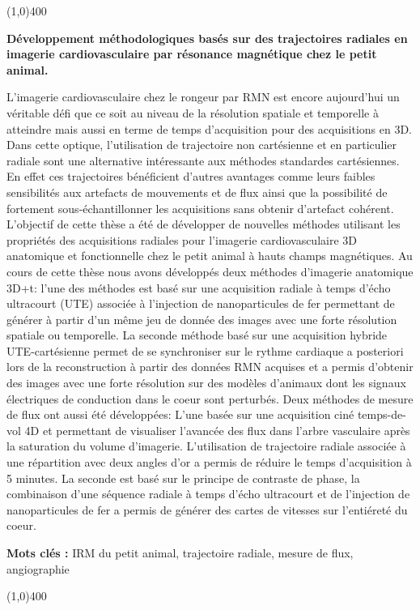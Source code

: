 \line(1,0){400} \\

\noindent
\small{\textbf{Développement méthodologiques basés sur des trajectoires radiales en imagerie cardiovasculaire par résonance magnétique chez le petit animal.}


L'imagerie cardiovasculaire chez le rongeur par RMN est encore aujourd'hui un véritable défi que ce soit au niveau de la résolution spatiale et temporelle à atteindre mais aussi en terme de temps d'acquisition pour des acquisitions en 3D.
Dans cette optique, l'utilisation de trajectoire non cartésienne et en particulier radiale sont une alternative intéressante aux méthodes standardes cartésiennes. En effet ces trajectoires bénéficient d'autres avantages comme leurs faibles sensibilités aux artefacts de mouvements et de flux ainsi que la possibilité de fortement sous-échantillonner les acquisitions sans obtenir d'artefact cohérent. L'objectif de cette thèse a été de développer de nouvelles méthodes utilisant les propriétés des acquisitions radiales pour l'imagerie cardiovasculaire 3D anatomique et fonctionnelle chez le petit animal à hauts champs magnétiques.
Au cours de cette thèse nous avons développés deux méthodes d'imagerie anatomique 3D+t: l'une des méthodes est basé sur une acquisition radiale à temps d'écho ultracourt (UTE) associée à l'injection de nanoparticules de fer permettant de générer à partir d'un même jeu de donnée des images avec une forte résolution spatiale ou temporelle. La seconde méthode basé sur une acquisition hybride UTE-cartésienne permet de se synchroniser sur le rythme cardiaque a posteriori lors de la reconstruction à partir des données RMN acquises et a permis d'obtenir des images avec une forte résolution sur des modèles d'animaux dont les signaux électriques de conduction dans le coeur sont perturbés.
Deux méthodes de mesure de flux ont aussi été développées: L'une basée sur une acquisition ciné temps-de-vol 4D et permettant de visualiser l'avancée des flux dans l'arbre vasculaire après la saturation du volume d'imagerie. L'utilisation de trajectoire radiale associée à une répartition avec deux angles d'or a permis de réduire le temps d'acquisition à 5 minutes. La seconde est basé sur le principe de contraste de phase, la combinaison d'une séquence radiale à temps d'écho ultracourt et de l'injection de nanoparticules de fer a permis de générer des cartes de vitesses sur l'entiéreté du coeur.

\noindent
\textbf{Mots clés : } IRM du petit animal, trajectoire radiale, mesure de flux, angiographie
}



\line(1,0){400}